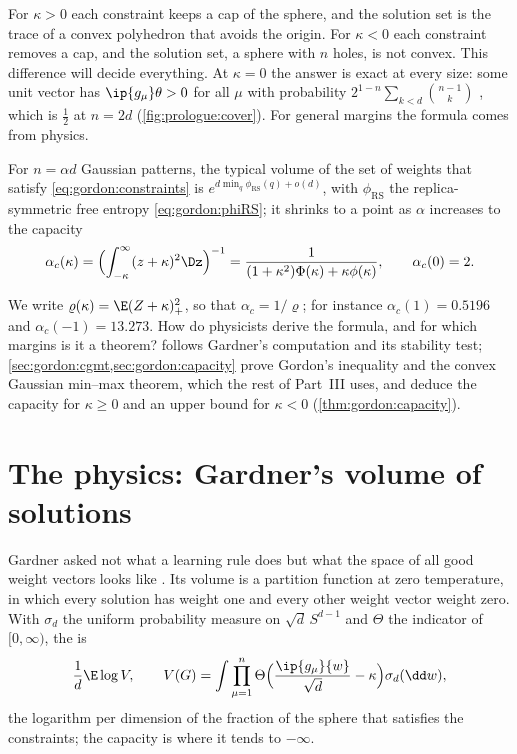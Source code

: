 \begin{refsection}
For $\kappa>0$ each constraint keeps a cap of the sphere, and the solution set is the trace of a convex polyhedron that avoids the origin. For $\kappa<0$ each constraint removes a cap, and the solution set, a sphere with $n$ holes, is not convex. This difference will decide everything. At $\kappa=0$ the answer is exact at every size: some unit vector has $\ip{g_\mu}\theta>0$ for all $\mu$ with probability $2^{1-n}\sum_{k<d}\binom{n-1}k$ \parencite{Wendel1962,Cover1965}, which is $\frac12$ at $n=2d$ (\cref{fig:prologue:cover}). For general margins the formula comes from physics.

\begin{physicsbox}[Gardner 1988]
For $n=\alpha d$ Gaussian patterns, the typical volume of the set of weights that satisfy \eqref{eq:gordon:constraints} is $e^{d\min_q\phi_{\mathrm{RS}}(q)+o(d)}$, with $\phi_{\mathrm{RS}}$ the replica-symmetric free entropy \eqref{eq:gordon:phiRS}; it shrinks to a point as $\alpha$ increases to the capacity
\[
\alpha_c(\kappa)=\Bigl(\int_{-\kappa}^\infty(z+\kappa)^2\Dz\Bigr)^{-1}=\frac1{(1+\kappa^2)\Phi(\kappa)+\kappa\phi(\kappa)},\qquad\alpha_c(0)=2.
\]
\end{physicsbox}

We write $\varrho(\kappa)=\E(Z+\kappa)_+^2$, so that $\alpha_c=1/\varrho$; for instance $\alpha_c(1)=0.5196$ and $\alpha_c(-1)=13.273$. How do physicists derive the formula, and for which margins is it a theorem?  follows Gardner's computation and its stability test; \cref{sec:gordon:cgmt,sec:gordon:capacity} prove Gordon's inequality and the convex Gaussian min--max theorem, which the rest of Part~III uses, and deduce the capacity for $\kappa\ge0$ and an upper bound for $\kappa<0$ (\cref{thm:gordon:capacity}).

\section{The physics: Gardner's volume of solutions}\label{sec:gordon:physics}

Gardner asked not what a learning rule does but what the space of all good weight vectors looks like \parencite{Gardner1988}. Its volume is a partition function at zero temperature, in which every solution has weight one and every other weight vector weight zero. With $\sigma_d$ the uniform probability measure on $\sqrt d\,S^{d-1}$ and $\Theta$ the indicator of $[0,\infty)$, the  is
\begin{equation}\label{eq:gordon:volume}
\frac1d\E\log V,\qquad V(G)=\int\prod_{\mu=1}^n\Theta\Bigl(\frac{\ip{g_\mu}{w}}{\sqrt d}-\kappa\Bigr)\sigma_d(\dd w),
\end{equation}
the logarithm per dimension of the fraction of the sphere that satisfies the constraints; the capacity is where it tends to $-\infty$.


\end{refsection}
